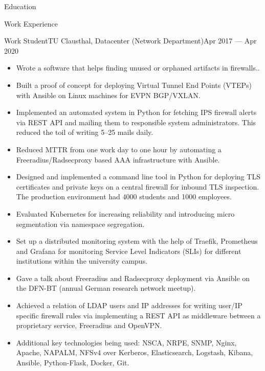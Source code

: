 \documentclass[]{mcdowellcv}
\begin{document}
\begin{cvsection}{Education}
\begin{cvsection}{Work Experience}
\begin{cvsubsection}{Work Student}{TU Clausthal, Datacenter (Network Department)}{Apr 2017 --- Apr 2020}
\bigskip
\begin{itemize}
\item Wrote a software that helps finding unused or orphaned artifacts in firewalls..
\item Built a proof of concept for deploying Virtual Tunnel End Points (VTEPs) with Ansible on Linux machines for EVPN BGP/VXLAN.
\item Implemented an automated system in Python for fetching IPS firewall alerts via REST API and mailing them to responsible system administrators. This reduced the toil of writing 5--25 mails daily.
\item Reduced MTTR from one work day to one hour by automating a Freeradius/Radsecproxy based AAA infrastructure with Ansible.
\item Designed and implemented a command line tool in Python for deploying TLS certificates and private keys on a central firewall for inbound TLS inspection. The production environment had 4000 students and 1000 employees.
\item Evaluated Kubernetes for increasing reliability and introducing micro segmentation via namespace segregation.
\item Set up a distributed monitoring system with the help of Traefik, Prometheus and Grafana for monitoring Service Level Indicators (SLIs) for different institutions within the university campus.
\item Gave a talk about Freeradius and Radsecproxy deployment via Ansible on the DFN-BT (annual German research network meetup).
\item Achieved a relation of LDAP users and IP addresses for writing user/IP specific firewall rules via implementing a REST API as middleware between a proprietary service, Freeradius and OpenVPN.\@
\item Additional key technologies being used: NSCA, NRPE, SNMP, Nginx, Apache, NAPALM, NFSv4 over Kerberos, Elasticsearch, Logstash, Kibana, Ansible, Python-Flask, Docker, Git.
\end{itemize}
\end{cvsubsection}


\end{cvsection}
\end{cvsection}
\end{document}

